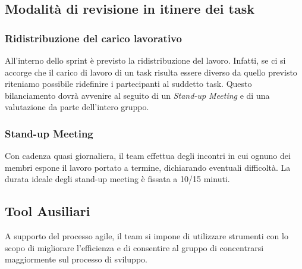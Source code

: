 \subsection{Modalità di revisione in itinere dei task}

\subsubsection{Ridistribuzione del carico lavorativo}
All'interno dello sprint è previsto la ridistribuzione del lavoro. Infatti, se ci si accorge che il carico di lavoro
di un task risulta essere diverso da quello previsto riteniamo possibile ridefinire i partecipanti al suddetto task.
Questo bilanciamento dovrà avvenire al seguito di un \textit{Stand-up Meeting} e di una valutazione da parte dell'intero
gruppo.

\subsubsection{Stand-up Meeting}
Con cadenza quasi giornaliera, il team effettua degli incontri in cui ognuno dei membri
espone il lavoro portato a termine, dichiarando eventuali difficoltà.
La durata ideale degli stand-up meeting è fissata a 10/15 minuti.

\subsection{Tool Ausiliari}
A supporto del processo agile, il team si impone di utilizzare strumenti con lo scopo di migliorare
l’efficienza e di consentire al gruppo di concentrarsi maggiormente sul processo di sviluppo.

